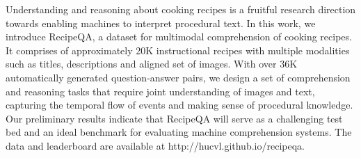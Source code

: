 Understanding and reasoning about cooking recipes is a fruitful research direction towards enabling machines to interpret procedural text. In this work, we introduce RecipeQA, a dataset for multimodal comprehension of cooking recipes. It comprises of approximately 20K instructional recipes with multiple modalities such as titles, descriptions and aligned set of images. With over 36K automatically generated question-answer pairs, we design a set of comprehension and reasoning tasks that require joint understanding of images and text, capturing the temporal flow of events and making sense of procedural knowledge. Our preliminary results indicate that RecipeQA will serve as a challenging test bed and an ideal benchmark for evaluating machine comprehension systems.  The data and leaderboard are available at http://hucvl.github.io/recipeqa.
